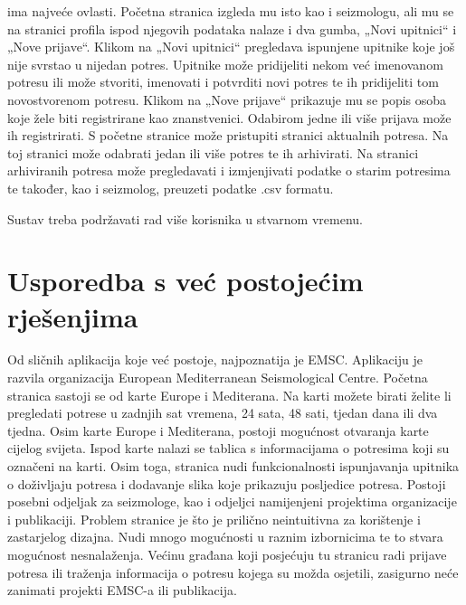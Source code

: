  ima najveće ovlasti. Početna stranica izgleda mu isto kao i seizmologu, ali mu se na stranici profila ispod njegovih podataka nalaze i dva gumba, „Novi upitnici“ i „Nove prijave“. Klikom na „Novi upitnici“ pregledava ispunjene upitnike koje još nije svrstao u nijedan potres. Upitnike može pridijeliti nekom već imenovanom potresu ili može stvoriti, imenovati i potvrditi novi potres te ih pridijeliti tom novostvorenom potresu. Klikom na „Nove prijave“ prikazuje mu se popis osoba koje žele biti registrirane kao znanstvenici. Odabirom jedne ili više prijava može ih registrirati. S početne stranice može pristupiti stranici aktualnih potresa. Na toj stranici može odabrati jedan ili više potres te ih arhivirati. Na stranici arhiviranih potresa može pregledavati i izmjenjivati podatke o starim potresima te također, kao i seizmolog, preuzeti podatke .csv formatu.

Sustav treba podržavati rad više korisnika u stvarnom vremenu.\\



\section{Usporedba s već postojećim rješenjima}

{Od sličnih aplikacija koje već postoje, najpoznatija je EMSC. Aplikaciju je razvila organizacija European Mediterranean Seismological Centre. 
Početna stranica sastoji se od karte Europe i Mediterana. Na karti možete birati želite li pregledati potrese u zadnjih sat  vremena, 24 sata, 48 sati, tjedan dana ili dva tjedna. Osim karte Europe i Mediterana, postoji mogućnost otvaranja karte cijelog svijeta. 
Ispod karte nalazi se tablica s informacijama o potresima koji su označeni na karti. Osim toga, stranica nudi funkcionalnosti ispunjavanja upitnika o doživljaju potresa i dodavanje slika koje prikazuju posljedice potresa. Postoji posebni odjeljak za seizmologe, kao i odjeljci namijenjeni projektima organizacije i publikaciji. Problem stranice je što je prilično neintuitivna za korištenje i zastarjelog dizajna. Nudi mnogo mogućnosti u raznim izbornicima te to stvara mogućnost nesnalaženja. Većinu građana koji posjećuju tu stranicu radi prijave potresa ili traženja informacija o potresu kojega su možda osjetili, zasigurno neće zanimati projekti EMSC-a ili publikacija.}

